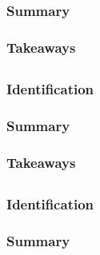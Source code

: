 \documentclass[
	letterpaper, %
]{jdf}
\begin{document}
\subsubsection{Summary}


\subsubsection{Takeaways}

 \subsection{\fullcite{}}
\subsubsection{Identification}


\subsubsection{Summary}


\subsubsection{Takeaways}

 \subsection{\fullcite{}}
\subsubsection{Identification}


\subsubsection{Summary}
\end{document}
